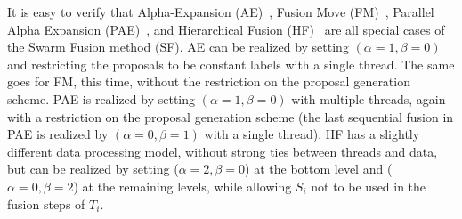 \noindent It is easy to verify that Alpha-Expansion
(AE)~\cite{alpha_expansion}, Fusion Move
(FM)~\cite{fusion_moves_for_markov_random_field_optimization},
Parallel Alpha Expansion
(PAE)~\cite{fusion_moves_for_markov_random_field_optimization},
and Hierarchical Fusion
(HF)~\cite{delong_hierarchical_fusion,olga_hierarchical_alpha_expansion}
are all special cases of the Swarm Fusion method (SF). AE
can be realized by setting $(\alpha=1, \beta=0)$ and
restricting the proposals to be constant labels with
a single thread. The same goes for FM, this time, without
the restriction on the proposal generation scheme. PAE is
realized by setting $(\alpha=1,\beta=0)$ with multiple
threads, again with a restriction on the proposal generation
scheme (the last sequential fusion in PAE is realized by
$(\alpha=0, \beta=1)$ with a single thread).
%
HF has a slightly different data processing model, without strong ties
between threads and data, but can be realized by setting ($\alpha=2,
\beta=0$) at the bottom level and ($\alpha=0, \beta=2$) at the remaining
levels, while allowing $S_i$ not to be used in the fusion steps of
$T_i$.





%


